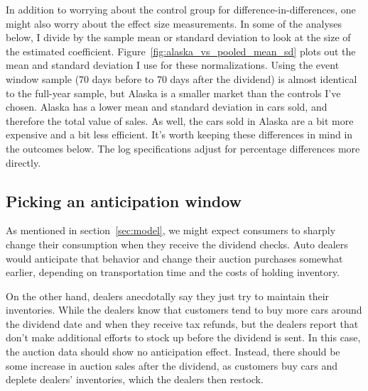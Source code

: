 \documentclass[11pt,letterpaper,oneside]{article}
\newcommand{\snippet}[1]{\hspace{-0.15em}}
\begin{document}
\begin{doublespacing}
In addition to worrying about the control group for difference\hyp{}in\hyp{}differences, one might also worry about the effect size measurements.
In some of the analyses below, I divide by the sample mean or standard deviation to look at the size of the estimated coefficient.
Figure~\ref{fig:alaska_vs_pooled_mean_sd} plots out the mean and standard deviation I use for these normalizations.
Using the event window sample (70 days before to 70 days after the dividend) is almost identical to the full-year sample, but Alaska is a smaller market than the controls I've chosen.
Alaska has a lower mean and standard deviation in cars sold, and therefore the total value of sales.
As well, the cars sold in Alaska are a bit more expensive and a bit less efficient.
It's worth keeping these differences in mind in the outcomes below.
The log specifications adjust for percentage differences more directly.

\subsection{Picking an anticipation window}

As mentioned in section~\ref{sec:model}, we might expect consumers to sharply change their consumption when they receive the dividend checks.
Auto dealers would anticipate that behavior and change their auction purchases somewhat earlier, depending on transportation time and the costs of holding inventory.

On the other hand, dealers anecdotally say they just try to maintain their inventories.
While the dealers know that customers tend to  buy more cars around the dividend date and when they receive tax refunds, but the dealers report that don't make additional efforts to stock up before the dividend is sent.
In this case, the auction data should show no anticipation effect.
Instead, there should be some increase in auction sales after the dividend, as customers buy cars and deplete dealers' inventories, which the dealers then restock.

%


\end{doublespacing}
\end{document}
